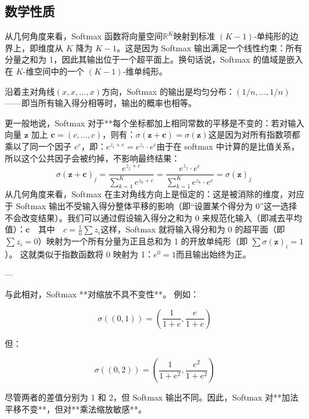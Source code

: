 \subsection{数学性质}
从几何角度来看，Softmax 函数将向量空间$\mathbb{R}^K$映射到标准 $(K - 1)$-单纯形的边界上，即维度从 $K$ 降为 $K - 1$。这是因为 Softmax 输出满足一个线性约束：所有分量之和为 1，因此其输出位于一个超平面上。换句话说，Softmax 的值域是嵌入在 $K$-维空间中的一个 $(K - 1)$-维单纯形。

沿着主对角线$(x, x, \dots, x)$方向，Softmax 的输出是均匀分布：$(1/n, \dots, 1/n)$——即当所有输入得分相等时，输出的概率也相等。

更一般地说，Softmax 对于**每个坐标都加上相同常数的平移是不变的：若对输入向量 $\mathbf{z}$ 加上 $\mathbf{c} = (c, \dots, c)$，则有：$\sigma(\mathbf{z} + \mathbf{c}) = \sigma(\mathbf{z})$这是因为对所有指数项都乘以了同一个因子 $e^c$，即：$e^{z_i + c} = e^{z_i} \cdot e^c$由于在 softmax 中计算的是比值关系，所以这个公共因子会被约掉，不影响最终结果：
$$
\sigma(\mathbf{z} + \mathbf{c})_j = \frac{e^{z_j + c}}{\sum_{k=1}^{K} e^{z_k + c}} = \frac{e^{z_j} \cdot e^c}{\sum_{k=1}^{K} e^{z_k} \cdot e^c} = \sigma(\mathbf{z})_j~
$$
从几何角度来看，Softmax 在主对角线方向上是恒定的：这是被消除的维度，对应于 Softmax 输出不受输入得分整体平移的影响（即“设置某个得分为 0”这一选择不会改变结果）。我们可以通过假设输入得分之和为 0 来规范化输入（即减去平均值）：$\mathbf{c} \quad \text{其中} \quad c = \frac{1}{n} \sum z_i$这样，Softmax 就将输入得分和为 0 的超平面（即$\sum z_i = 0$）映射为一个所有分量为正且总和为 1 的开放单纯形（即  
$
\sum \sigma(\mathbf{z})_i = 1
$）。  
这就类似于指数函数将 0 映射为 1：$e^0 = 1$而且输出始终为正。

---

与此相对，Softmax **对缩放不具不变性**。
例如：

$$
\sigma((0, 1)) = \left( \frac{1}{1 + e}, \frac{e}{1 + e} \right)
$$

但：

$$
\sigma((0, 2)) = \left( \frac{1}{1 + e^2}, \frac{e^2}{1 + e^2} \right)
$$

尽管两者的差值分别为 1 和 2，但 Softmax 输出不同。因此，Softmax 对**加法平移不变**，但对**乘法缩放敏感**。
